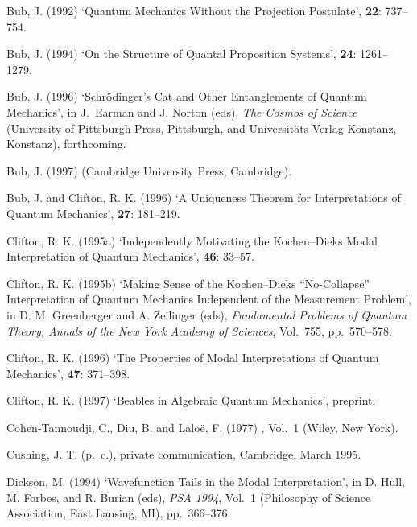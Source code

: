 \documentclass[12pt]{article}
\begin{document}
\begin{thebibliography}{10}
Bub, J.  (1992)
\newblock `Quantum Mechanics Without the Projection
Postulate',
 {\bf 22}: 737--754.

Bub, J.  (1994)
\newblock `On the Structure of Quantal Proposition Systems',
 {\bf 24}: 1261--1279.

Bub, J. (1996)
\newblock `Schr\"{o}dinger's Cat and Other
Entanglements of Quantum Mechanics',
\newblock in J.\ Earman and J. Norton (eds),
{\em The Cosmos of Science}
(University of Pittsburgh Press, Pittsburgh, and
Universit\"{a}ts-Verlag Konstanz, Konstanz), forthcoming.

Bub, J. (1997)
(Cambridge University Press, Cambridge).

Bub, J. and Clifton, R. K. (1996)
\newblock `A Uniqueness Theorem for Interpretations of Quantum Mechanics',
{\bf 27}: 181--219.

Clifton, R. K. (1995a)
\newblock `Independently Motivating the Kochen--Dieks Modal Interpretation
of Quantum Mechanics',
 {\bf
46}: 33--57.

Clifton, R. K. (1995b)
\newblock `Making Sense of the Kochen--Dieks ``No-Collapse'' Interpretation
of Quantum Mechanics Independent of the Measurement Problem',
\newblock in D. M. Greenberger and A. Zeilinger (eds), {\em Fundamental
Problems of Quantum Theory, Annals of the New York Academy of Sciences},
Vol.~755, \mbox{pp. 570--578}.

Clifton, R. K. (1996)
\newblock `The Properties of Modal Interpretations of Quantum Mechanics',
{\bf 47}: 371--398.

Clifton, R. K. (1997)
\newblock `Beables in Algebraic Quantum Mechanics', preprint.

Cohen-Tannoudji, C., Diu, B. and Lalo\"e, F. (1977)
, Vol.~1
\newblock (Wiley, New York).

Cushing, J. T. (p.~c.), private communication, Cambridge, March 1995.

Dickson, M. (1994)
\newblock `Wavefunction Tails in the Modal Interpretation',
\newblock in D. Hull, M. Forbes, and R. Burian (eds), {\em PSA 1994},
Vol.~1 (Philosophy of Science Association, East Lansing, MI),
\mbox{pp. 366--376}.


\end{thebibliography}
\end{document}
